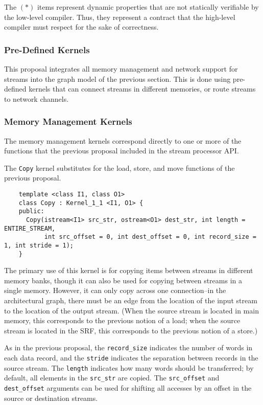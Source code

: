 The $(*)$ items represent dynamic properties that are not statically
verifiable by the low-level compiler.  Thus, they represent a contract
that the high-level compiler must respect for the sake of correctness.

\subsubsection{Pre-Defined Kernels}
\label{sec:predef}

This proposal integrates all memory management and network support for
streams into the graph model of the previous section.  This is done
using pre-defined kernels that can connect streams in different
memories, or route streams to network channels.

\subsubsection*{Memory Management Kernels}

The memory management kernels correspond directly to one or more of
the functions that the previous proposal included in the stream
processor API.

 The {\tt Copy} kernel substitutes for the load, store, and move
functions of the previous proposal.
{\small
\begin{verbatim}
    template <class I1, class O1> 
    class Copy : Kernel_1_1 <I1, O1> {
    public:
      Copy(istream<I1> src_str, ostream<O1> dest_str, int length = ENTIRE_STREAM,
           int src_offset = 0, int dest_offset = 0, int record_size = 1, int stride = 1);
    }
\end{verbatim}}

The primary use of this kernel is for copying items between streams in
different memory banks, though it can also be used for copying between
streams in a single memory.  However, it can only copy across one
connection--in the architectural graph, there must be an edge from the
location of the input stream to the location of the output stream.
(When the source stream is located in main memory, this corresponds to
the previous notion of a load; when the source stream is located in
the SRF, this corresponds to the previous notion of a store.)

As in the previous proposal, the {\tt record\_size} indicates the
number of words in each data record, and the {\tt stride} indicates
the separation between records in the source stream.  The {\tt length}
indicates how many words should be transferred; by default, all
elements in the {\tt src\_str} are copied.  The {\tt src\_offset} and
{\tt dest\_offset} arguments can be used for shifting all accesses by
an offset in the source or destination streams.  

